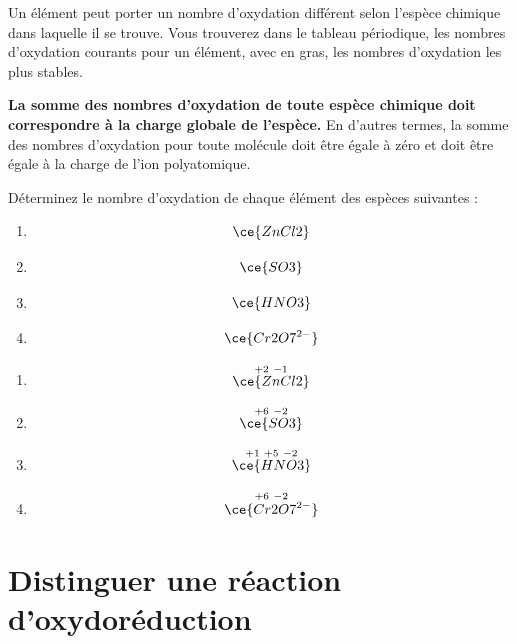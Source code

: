 \documentclass[
  11pt,
  a4paper,
  openany]{book}
\providecommand{\tightlist}{%
  \setlength{\itemsep}{0pt}\setlength{\parskip}{0pt}}
\begin{document}
Un élément peut porter un nombre d'oxydation différent selon l'espèce chimique dans laquelle il se trouve. Vous trouverez dans le tableau périodique, les nombres d'oxydation courants pour un élément, avec en gras, les nombres d'oxydation les plus stables.

\textbf{La somme des nombres d'oxydation de toute espèce chimique doit correspondre à la charge globale de l'espèce.} En d'autres termes, la somme des nombres d'oxydation pour toute molécule doit être égale à zéro et doit être égale à la charge de l'ion polyatomique.

\begin{Exercise}

Déterminez le nombre d'oxydation de chaque élément des espèces suivantes :

\begin{enumerate}
\def\labelenumi{\alph{enumi}.}
\tightlist
\item
  \[
  \ce{ZnCl2}
  \]
\item
  \[
  \ce{SO3}
  \]
\item
  \[
  \ce{HNO3}
  \]
\item
  \[
  \ce{Cr2O7^{2-}}
  \]
\end{enumerate}

\end{Exercise}

\begin{Answer}

\begin{enumerate}
\def\labelenumi{\alph{enumi}.}
\tightlist
\item
  \[
  \overset{+2\ -1}{\ce{ZnCl2}}
  \]
\item
  \[
  \overset{+6\ -2}{\ce{SO3}}
  \]
\item
  \[
  \overset{+1\ +5\ -2}{\ce{HNO3}}
  \]
\item
  \[
  \overset{+6\ -2}{\ce{Cr2O7^{2-}}}
  \]
\end{enumerate}

\end{Answer}

\clearpage

\hypertarget{distinguer-une-ruxe9action-doxydoruxe9duction}{%
\section{Distinguer une réaction d'oxydoréduction}\label{distinguer-une-ruxe9action-doxydoruxe9duction}}
\end{document}
